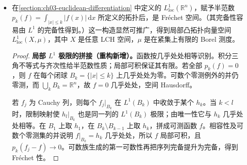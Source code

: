 \documentclass[../../main.tex]{subfiles}
\begin{document}
\begin{examples}
\begin{itemize}
\begin{proof}
连续函数在紧集上有界，故 $C(X)\subseteq B_{\mathrm{loc}}(X)$。在紧集上一致的连续函数极限仍连续：对每点取紧邻域，在该紧邻域上一致极限连续，于其内部就有原空间的连续性。因此 $C(X)$ 闭。其 Cauchy 网的极限先由大空间完备性存在，再由闭性留在 $C(X)$，故 $C(X)$ 也是 Fr\'echet 空间。

在 LCH 空间，紧集有界等价于局部有界：前者用紧邻域给局部界；后者在任意紧集上取有限个有界邻域覆盖，取有限个界的最大值。这也解释了 $B_{\mathrm{loc}}$ 的记号。
\end{proof}
\begin{remark}
\textbf{动机与逐条件说明（重构新增）。}紧一致拓扑只控制有限范围，适合无界底空间上的函数。限制函数在紧集上有界保证半范数有限；$\sigma$-紧性与局部紧性共同提供可数紧穷竭，Hausdorff 性是这里 LCH 背景及既用紧性命题的一部分。上述一般函数完备性来自标量完备性，连续极限保持连续另用局部紧邻域。正确结论不要求函数在整个 $X$ 上有界，也不要求可微。
\end{remark}
\item
在\cref{section:ch03-euclidean-differentiation} 中定义的 $L^1_{\mathrm{loc}}(\mathbb R^n)$，赋予半范数 $p_k(f)=\int_{|x|\le k}|f(x)|\,\mathrm dx$ 所定义的拓扑后，是 Fr\'echet 空间。（其完备性容易由 $L^1$ 的完备性得到。）这一构造显然可推广，得到局部凸拓扑向量空间 $L^1_{\mathrm{loc}}(X,\mu)$，其中 $X$ 是任意 LCH 空间，$\mu$ 是在紧集上有限的 Borel 测度。
\begin{proof}
\textbf{局部 $L^1$ 极限的拼接（重构新增）。}函数按几乎处处相等识别。积分三角不等式与齐次性给半范数性质；局部可积保证其有限。若全部 $p_k(f)=0$，则 $f$ 在每个闭球 $B_k=\{|x|\le k\}$ 上几乎处处为零。可数个零测例外的并仍零测，而 $\bigcup_kB_k=\mathbb R^n$，故 $f=0$ 几乎处处，空间 Hausdorff。

若 $f_j$ 为 Cauchy 列，则每个 $f_j|_{B_k}$ 在 $L^1(B_k)$ 中收敛于某个 $h_k$。当 $k<l$ 时，限制映射使 $h_l|_{B_k}$ 也是同一列的 $L^1(B_k)$ 极限；由唯一性它与 $h_k$ 几乎处处相等。在 $B_1$ 上取 $h_1$，在 $B_k\setminus B_{k-1}$ 上取 $h_k$，拼成可测函数 $f$。相容性及可数个零测集的并说明 $f|_{B_k}=h_k$ 几乎处处，所以 $f$ 局部可积，且 $p_k(f_j-f)\to0$。可数族生成的第一可数性再把序列完备提升为完备，得到 Fr\'echet 性。


\end{proof}
\end{itemize}
\end{examples}
\end{document}

